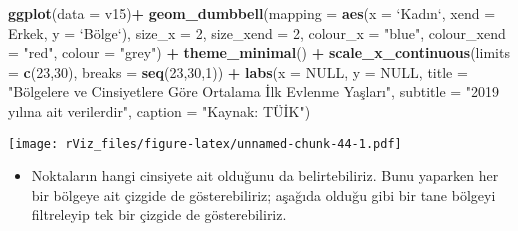 \documentclass[
]{book}
\newenvironment{Shaded}{\begin{snugshade}}{\end{snugshade}}
\newcommand{\DataTypeTok}[1]{\textcolor[rgb]{0.13,0.29,0.53}{#1}}
\newcommand{\DecValTok}[1]{\textcolor[rgb]{0.00,0.00,0.81}{#1}}
\newcommand{\KeywordTok}[1]{\textcolor[rgb]{0.13,0.29,0.53}{\textbf{#1}}}
\newcommand{\NormalTok}[1]{#1}
\newcommand{\OperatorTok}[1]{\textcolor[rgb]{0.81,0.36,0.00}{\textbf{#1}}}
\newcommand{\OtherTok}[1]{\textcolor[rgb]{0.56,0.35,0.01}{#1}}
\newcommand{\StringTok}[1]{\textcolor[rgb]{0.31,0.60,0.02}{#1}}
\providecommand{\tightlist}{%
  \setlength{\itemsep}{0pt}\setlength{\parskip}{0pt}}
\begin{document}
\begin{Shaded}
\begin{Highlighting}[]
\KeywordTok{ggplot}\NormalTok{(}\DataTypeTok{data =}\NormalTok{ v15)}\OperatorTok{+}
\StringTok{  }\KeywordTok{geom_dumbbell}\NormalTok{(}\DataTypeTok{mapping =} \KeywordTok{aes}\NormalTok{(}\DataTypeTok{x =} \StringTok{`}\DataTypeTok{Kadın}\StringTok{`}\NormalTok{, }\DataTypeTok{xend =}\NormalTok{ Erkek, }\DataTypeTok{y =} \StringTok{`}\DataTypeTok{Bölge}\StringTok{`}\NormalTok{),}
                \DataTypeTok{size_x =} \DecValTok{2}\NormalTok{, }\DataTypeTok{size_xend =} \DecValTok{2}\NormalTok{,}
                \DataTypeTok{colour_x =} \StringTok{"blue"}\NormalTok{, }\DataTypeTok{colour_xend =} \StringTok{"red"}\NormalTok{,}
                \DataTypeTok{colour =} \StringTok{"grey"}\NormalTok{) }\OperatorTok{+}
\StringTok{  }\KeywordTok{theme_minimal}\NormalTok{() }\OperatorTok{+}
\StringTok{  }\KeywordTok{scale_x_continuous}\NormalTok{(}\DataTypeTok{limits =} \KeywordTok{c}\NormalTok{(}\DecValTok{23}\NormalTok{,}\DecValTok{30}\NormalTok{), }\DataTypeTok{breaks =} \KeywordTok{seq}\NormalTok{(}\DecValTok{23}\NormalTok{,}\DecValTok{30}\NormalTok{,}\DecValTok{1}\NormalTok{)) }\OperatorTok{+}
\StringTok{  }\KeywordTok{labs}\NormalTok{(}\DataTypeTok{x =} \OtherTok{NULL}\NormalTok{,}
       \DataTypeTok{y =} \OtherTok{NULL}\NormalTok{,}
       \DataTypeTok{title =} \StringTok{"Bölgelere ve Cinsiyetlere Göre Ortalama İlk Evlenme Yaşları"}\NormalTok{,}
       \DataTypeTok{subtitle =} \StringTok{"2019 yılına ait verilerdir"}\NormalTok{,}
       \DataTypeTok{caption =} \StringTok{"Kaynak: TÜİK"}\NormalTok{)}
\end{Highlighting}
\end{Shaded}

\texttt{[image: rViz\_files/figure-latex/unnamed-chunk-44-1.pdf]}

\begin{itemize}
\tightlist
\item
  Noktaların hangi cinsiyete ait olduğunu da belirtebiliriz. Bunu yaparken her bir bölgeye ait çizgide de gösterebiliriz; aşağıda olduğu gibi bir tane bölgeyi filtreleyip tek bir çizgide de gösterebiliriz.
\end{itemize}
\end{document}
